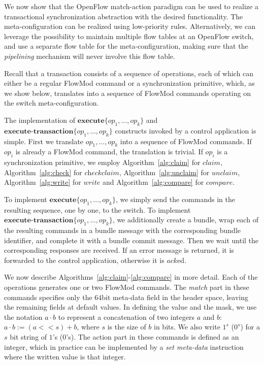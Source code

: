 \documentclass[conference]{sigcomm-alternate}
\newcommand{\concat}[0]{\cdot}
\newcommand{\exec}{\textbf{execute}}
\newcommand{\execatomic}{\textbf{execute-transaction}}
\newcommand{\ack}{\textit{ack}}
\newcommand{\ones}[1]{1^{#1}}
\newcommand{\zeros}[1]{0^{#1}}
\begin{document}
We now show that the OpenFlow match-action paradigm 
can be used  to realize a transactional synchronization abstraction
with the desired functionality. 
The 
meta-configuration can be realized using low-priority rules.
Alternatively, we can leverage the possibility to maintain multiple
flow tables at an OpenFlow switch, and use a separate flow table for
the meta-configuration,  making sure that the
\emph{pipelining} mechanism will never involve this
flow table.

Recall that a transaction consists of a sequence of operations,
each of which can either be a regular FlowMod command or a synchronization
primitive, which, as we
show below, translates into a sequence of FlowMod commands operating on the
switch meta-configuration.

The implementation of $\exec\{op_1,\ldots,op_k\}$ and
$\execatomic\{op_1,\ldots,op_k\}$ constructs
invoked by a control application is simple.
First we translate  $op_1,\ldots,op_k$ into a sequence of FlowMod
commands. If $op_i$ is already a FlowMod command, the translation is
trivial. If $op_i$ is a synchronization primitive, we employ
Algorithm~\ref{alg:claim} for $\textit{claim}$,
Algorithm~\ref{alg:check} for $\textit{checkclaim}$,
Algorithm~\ref{alg:unclaim}
for $\textit{unclaim}$,
Algorithm~\ref{alg:write} for $\textit{write}$ and
Algorithm~\ref{alg:compare} for $\textit{compare}$.

To implement  $\exec\{op_1,\ldots,op_k\}$, we simply send the commands in
the resulting sequence, one by one, to the switch.
%
To implement  $\execatomic\{op_1,\ldots,op_k\}$, we
additionally create a bundle, wrap each of the resulting commands in a
bundle message with the corresponding bundle identifier, and complete it
with a bundle commit message.
Then we wait until the
corresponding responses are received.
If an error message is returned,
it is forwarded to the control application,
otherwise it is $\ack$ed.

We now describe Algorithms~\ref{alg:claim}-\ref{alg:compare} in more
detail.
Each of the operations generates one or two FlowMod commands.
The \textit{match} part in these commands specifies only the $64$bit meta-data
field in the header space, leaving the remaining fields at default
values.
In defining the value and the mask,
we
use the notation $a\concat b$ to represent a concatenation of two
 integers $a$ and $b$: $a\concat b := (a<<s)+b$, where $s$ is the size of $b$ in bits.
We also write \texttt{$\ones{s}$} (\texttt{$\zeros{s}$}) for  a $s$ bit 
string of $1$'s ($0$'s).
%
The action part in these commands is defined as an integer, which in
practice can be implemented by a \emph{set meta-data} instruction where the written value is that integer.
\end{document}

